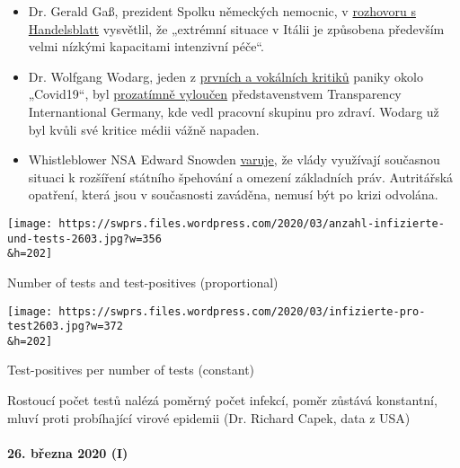 \begin{itemize}
{  až 75\% pozitivně testovaných osob bylo bez příznaků}.
\item
  Dr. Gerald Gaß, prezident Spolku německých nemocnic, v
  \href{https://www.handelsblatt.com/politik/deutschland/coronakrise-deutsche-krankenhausgesellschaft-wir-sind-besser-vorbereitet-als-italien/25651268.html}{rozhovoru
  s Handelsblatt} vysvětlil, že „extrémní situace v Itálii je způsobena
  především velmi nízkými kapacitami intenzivní péče``.
\item
  Dr. Wolfgang Wodarg, jeden z
  \href{https://www.youtube.com/watch?v=p_AyuhbnPOI}{prvních a vokálních
  kritiků} paniky okolo „Covid19``, byl
  \href{https://www.transparency.de/aktuelles/detail/article/in-eigener-sache-vorstand-beschliesst-ruhen-der-mitgliedschaft-von-wolfgang-wodarg-1/}{prozatímně
  vyloučen} představenstvem Transparency Internantional Germany, kde
  vedl pracovní skupinu pro zdraví. Wodarg už byl kvůli své kritice
  médii vážně napaden.
\item
  Whistleblower NSA Edward Snowden
  \href{https://www.cnet.com/news/snowden-warns-government-surveillance-amid-covid-19-could-be-long-lasting/}{varuje},
  že vlády využívají současnou situaci k rozšíření státního špehování a
  omezení základních práv. Autritářská opatření, která jsou v
  současnosti zaváděna, nemusí být po krizi odvolána.
\end{itemize}

\href{https://swprs.org/a-swiss-doctor-on-covid-19/anzahl-infizierte-und-tests-2603/}{}

\texttt{[image: https://swprs.files.wordpress.com/2020/03/anzahl-infizierte-und-tests-2603.jpg?w=356\\\&h=202]}

Number of tests and test-positives (proportional)

\href{https://swprs.org/covid-19-hinweis-ii/infizierte-pro-test2603/}{}

\texttt{[image: https://swprs.files.wordpress.com/2020/03/infizierte-pro-test2603.jpg?w=372\\\&h=202]}

Test-positives per number of tests (constant)

Rostoucí počet testů nalézá poměrný počet infekcí, poměr zůstává
konstantní, mluví proti probíhající virové epidemii (Dr. Richard Capek,
data z USA)

\hypertarget{26-bux159ezna-2020-i}{%
\paragraph{26. března 2020 (I)}\label{26-bux159ezna-2020-i}}

